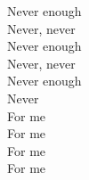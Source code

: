 Never enough\tab{}\\
Never, never\\
Never enough\tab{}\\
Never, never\\
Never enough\tab{}\\
Never\\
For me\tab{}\\
For me\\
For me\\
For me\tab{}\\
